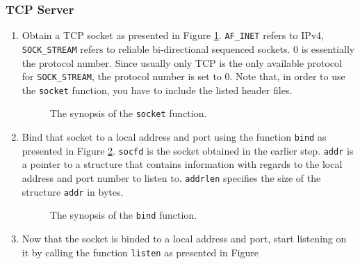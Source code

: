 \documentclass[pdftex,12pt,a4paper]{article}
\begin{document}
            \subsubsection{TCP Server}
                \begin{enumerate}
                    \item Obtain a TCP socket as presented in Figure
                        \ref{fig:socket}. \texttt{AF\_INET} refers to IPv4,
                        \texttt{SOCK\_STREAM} refers to reliable bi-directional
                        sequenced sockets. 0 is essentially the protocol number. Since
                        usually only TCP is the only available protocol for
                        \texttt{SOCK\_STREAM}, the protocol number is set to 0.
                        Note that, in order to use the \texttt{socket}
                        function, you have to include the listed header files.
                        \begin{figure}[tbh]
                            \centering
                            
                            \caption{The synopsis of the \texttt{socket} function.}
                            \label{fig:socket}
                        \end{figure}
                    \item Bind that socket to a local address and port using
                        the function \texttt{bind} as presented in Figure
                        \ref{fig:bind}. \texttt{socfd} is the socket obtained
                        in the earlier step.  \texttt{addr} is a pointer to a
                        structure that contains information with regards to the
                        local address and port number to listen to.
                        \texttt{addrlen} specifies the size of the structure
                        \texttt{addr} in bytes.
                        \begin{figure}[tbh]
                            \centering
                            
                            \caption{The synopsis of the \texttt{bind} function.}
                            \label{fig:bind}
                        \end{figure}
                    \item Now that the socket is binded to a local address and
                        port, start listening on it by calling the function
                        \texttt{listen} as presented in Figure

\end{enumerate}
\end{document}

